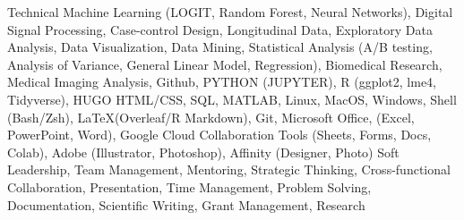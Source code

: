 

\begin{cvskills}

\cvskill
    {Technical} %
    {Machine Learning (LOGIT, Random Forest, Neural Networks), Digital Signal Processing, Case-control Design, Longitudinal Data, Exploratory Data Analysis, Data Visualization, Data Mining, Statistical Analysis (A/B testing, Analysis of Variance, General Linear Model, Regression), Biomedical Research, Medical Imaging Analysis, Github, PYTHON (JUPYTER), R (ggplot2, lme4, Tidyverse), HUGO HTML/CSS, SQL, MATLAB, Linux, MacOS, Windows, Shell (Bash/Zsh), \LaTeX (Overleaf/R Markdown), Git, Microsoft Office, (Excel, PowerPoint, Word), Google Cloud Collaboration Tools (Sheets, Forms, Docs, Colab), Adobe (Illustrator, Photoshop), Affinity (Designer, Photo)} %
  \cvskill
    {Soft} %
    {Leadership, Team Management, Mentoring, Strategic Thinking, Cross-functional Collaboration, Presentation, Time Management, Problem Solving, Documentation, Scientific Writing, Grant Management, Research} %

\end{cvskills}
